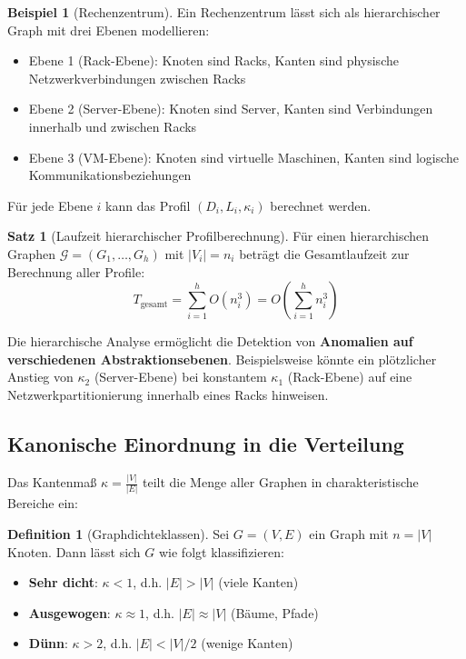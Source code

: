 ﻿\documentclass[a4paper,12pt]{article}
\theoremstyle{definition}
\newtheorem{definition}{Definition}
\newtheorem{beispiel}{Beispiel}
\newtheorem{satz}{Satz}
\begin{document}
	\begin{beispiel}[Rechenzentrum]
		Ein Rechenzentrum lässt sich als hierarchischer Graph mit drei Ebenen modellieren:
		\begin{itemize}
			\item[-] Ebene 1 (Rack-Ebene): Knoten sind Racks, Kanten sind physische Netzwerkverbindungen zwischen Racks
			\item[-] Ebene 2 (Server-Ebene): Knoten sind Server, Kanten sind Verbindungen innerhalb und zwischen Racks
			\item[-] Ebene 3 (VM-Ebene): Knoten sind virtuelle Maschinen, Kanten sind logische Kommunikationsbeziehungen
		\end{itemize}
		Für jede Ebene $i$ kann das Profil $(D_i, L_i, \kappa_i)$ berechnet werden.
	\end{beispiel}
	
	\begin{satz}[Laufzeit hierarchischer Profilberechnung]
		Für einen hierarchischen Graphen $\mathcal{G} = (G_1, \ldots, G_h)$ mit $|V_i| = n_i$ beträgt die Gesamtlaufzeit zur Berechnung aller Profile:
		\[
		T_{\text{gesamt}} = \sum_{i=1}^{h} O(n_i^3) = O\left(\sum_{i=1}^{h} n_i^3\right)
		\]
	\end{satz}
	
	Die hierarchische Analyse ermöglicht die Detektion von \textbf{Anomalien auf verschiedenen Abstraktionsebenen}. Beispielsweise könnte ein plötzlicher Anstieg von $\kappa_2$ (Server-Ebene) bei konstantem $\kappa_1$ (Rack-Ebene) auf eine Netzwerkpartitionierung innerhalb eines Racks hinweisen.
	
	\subsection{Kanonische Einordnung in die Verteilung}
	
	Das Kantenmaß $\kappa = \frac{|V|}{|E|}$ teilt die Menge aller Graphen in charakteristische Bereiche ein:
	
	\begin{definition}[Graphdichteklassen]
		Sei $G = (V,E)$ ein Graph mit $n = |V|$ Knoten. Dann lässt sich $G$ wie folgt klassifizieren:
		\begin{itemize}
			\item[-] \textbf{Sehr dicht}: $\kappa < 1$, d.h. $|E| > |V|$ (viele Kanten)
			\item[-] \textbf{Ausgewogen}: $\kappa \approx 1$, d.h. $|E| \approx |V|$ (Bäume, Pfade)
			\item[-] \textbf{Dünn}: $\kappa > 2$, d.h. $|E| < |V|/2$ (wenige Kanten)
		\end{itemize}
	\end{definition}
	
\end{document}
